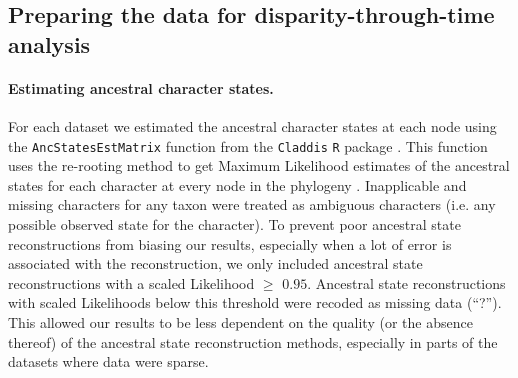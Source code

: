 \documentclass[12pt,a4paper]{article}
\begin{document}
\begin{landscape}
   
\end{landscape}

\subsection{Preparing the data for disparity-through-time analysis}

\paragraph{Estimating ancestral character states.}
\label{ace}
For each dataset we estimated the ancestral character states at each node using the \texttt{AncStatesEstMatrix} function from the \texttt{Claddis} \texttt{R} package \citep{Claddis,R}.
This function uses the re-rooting method \citep{Yang01121995,Garland2000} to get Maximum Likelihood estimates of the ancestral states for each character at every node in the phylogeny \citep[based on the \texttt{rerootingMethod} function in \texttt{phytools};][]{phytools}.
Inapplicable and missing characters for any taxon were treated as ambiguous characters (i.e. any possible observed state for the character).
To prevent poor ancestral state reconstructions from biasing our results, especially when a lot of error is associated with the reconstruction, we only included ancestral state reconstructions with a scaled Likelihood $\geq$ $0.95$.
Ancestral state reconstructions with scaled Likelihoods below this threshold were recoded as missing data (``?'').
This allowed our results to be less dependent on the quality (or the absence thereof) of the ancestral state reconstruction methods, especially in parts of the datasets where data were sparse.
 
\end{document}
